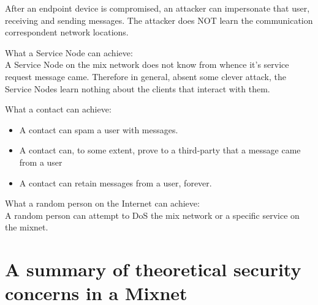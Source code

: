 \documentclass{article}
\begin{document}
After an endpoint device is compromised, an attacker can impersonate that user, receiving and sending messages. The attacker does NOT learn the communication correspondent network locations.
\vspace*{5px}

What a Service Node can achieve:\\

A Service Node on the mix network does not know from whence it's service request message came.
Therefore in general, absent some clever attack, the Service Nodes learn nothing about the clients
that interact with them.
\vspace*{10px}

What a contact can achieve:\\
\begin{itemize}
    \item A contact can spam a user with messages.
    \item A contact can, to some extent, prove to a third-party that a message came from a user
    \item A contact can retain messages from a user, forever.
\end{itemize}
\vspace*{10px}

What a random person on the Internet can achieve:\\

A random person can attempt to DoS the mix network or a specific service on the mixnet.


\pagebreak
\section{A summary of theoretical security concerns in a Mixnet}
\end{document}
